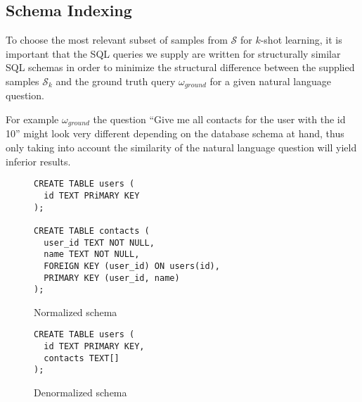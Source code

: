 \subsection{Schema Indexing}

To choose the most relevant subset of samples from $\mathcal{S}$ for $k$-shot learning,
it is important that the SQL queries we supply are written for structurally similar SQL schemas
in order to minimize the structural difference between the supplied samples $\mathcal{S}_k$ and
the ground truth query $\omega_{ground}$ for a given natural language question.

For example $\omega_{ground}$ the question ``Give me all contacts for the user with the id 10''
might look very different depending on the database schema at hand, thus only taking into
account the similarity of the natural language question will yield inferior results.

\vspace{1em}

\begin{figure}[ht]
\hfill
\begin{minipage}[b]{0.45\linewidth}
\centering
\begin{verbatim}
CREATE TABLE users (
  id TEXT PRiMARY KEY
);

CREATE TABLE contacts (
  user_id TEXT NOT NULL,
  name TEXT NOT NULL,
  FOREIGN KEY (user_id) ON users(id),
  PRIMARY KEY (user_id, name)
);
\end{verbatim}
\caption{Normalized schema}
\end{minipage}
\hfill
\begin{minipage}[b]{0.35\linewidth}
\centering
\begin{verbatim}
CREATE TABLE users (
  id TEXT PRIMARY KEY,
  contacts TEXT[]
);
\end{verbatim}
\caption{Denormalized schema}
\end{minipage}
\hfill
\end{figure}

\vspace{1em}



